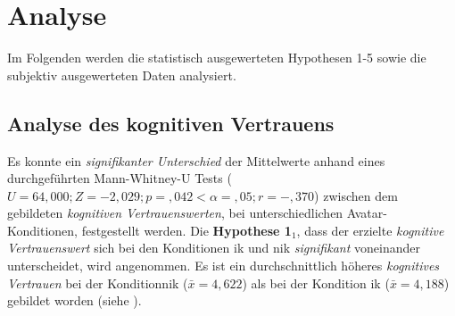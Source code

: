 \documentclass[a4paper,11pt]{article}%
\renewcommand{\\}{\vspace*{0.5\baselineskip} \newline}
\begin{document}
{\clearpage
\newpage
\section{Analyse}
Im Folgenden werden die statistisch ausgewerteten Hypothesen 1-5 sowie die subjektiv ausgewerteten Daten analysiert.

\subsection{Analyse des kognitiven Vertrauens}
Es konnte ein \textit{signifikanter Unterschied} der Mittelwerte anhand eines durchgeführten Mann-Whitney-U Tests ($U = 64,000; Z = -2,029; p =,042 < \alpha =,05; r =-,370$) zwischen dem gebildeten \textit{kognitiven Vertrauenswerten}, bei unterschiedlichen Avatar- Konditionen, festgestellt werden. 
Die \textbf{Hypothese 1$_{1}$}, dass der erzielte \textit{kognitive Vertrauenswert} sich bei den Konditionen \ac{ik} und \ac{nik} \textit{signifikant} voneinander unterscheidet, wird angenommen. Es ist ein durchschnittlich höheres \textit{kognitives Vertrauen} bei der Kondition\newline \ac{nik} ($\bar{x}=4,622$) als bei der Kondition \ac{ik} ($\bar{x}= 4,188$) gebildet worden (siehe ).\\

}
\end{document}
